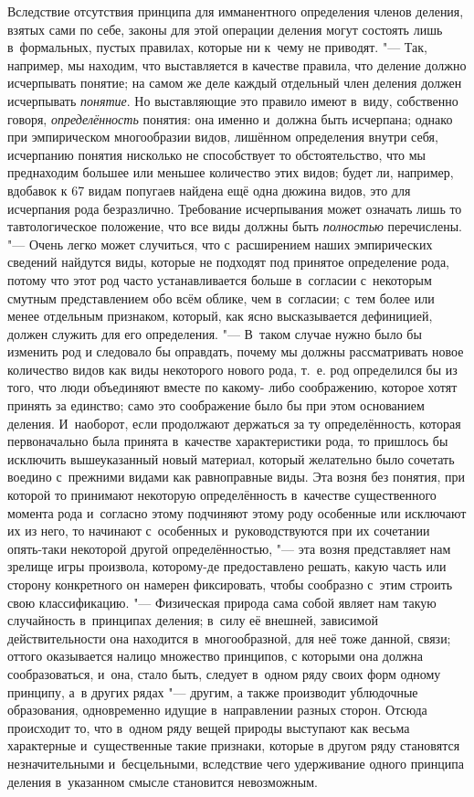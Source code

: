 Вследствие отсутствия принципа для имманентного определения
членов деления, взятых сами по себе, законы для этой операции деления могут
состоять лишь в~формальных, пустых правилах, которые ни к~чему не
приводят. "--- Так, например, мы находим, что выставляется в
качестве правила, что деление должно исчерпывать понятие; на самом же деле
каждый отдельный член деления должен исчерпывать {\em понятие}. Но
выставляющие это правило имеют в~виду, собственно говоря, {\em определённость}
понятия: она именно и~должна быть исчерпана; однако при
эмпирическом многообразии видов, лишённом определения внутри
себя, исчерпанию понятия нисколько не способствует то обстоятельство, что
мы преднаходим большее или меньшее количество этих видов; будет ли,
например, вдобавок к 67 видам попугаев найдена ещё одна дюжина видов, это
для исчерпания рода безразлично. Требование исчерпывания может означать
лишь то тавтологическое положение, что все виды должны быть {\em полностью}
перечислены. "--- Очень легко может случиться,
что с~расширением наших эмпирических сведений найдутся виды, которые не
подходят под принятое определение рода, потому что этот род часто
устанавливается больше в~согласии с~некоторым смутным представлением обо
всём облике, чем в~согласии; с~тем более или менее отдельным признаком,
который, как ясно высказывается дефиницией, должен служить для его
определения. "--- В~таком случае нужно было бы изменить род и
следовало бы оправдать, почему мы должны рассматривать новое количество
видов как виды некоторого нового рода, т.~е. род определился бы из того,
что люди объединяют вместе по какому- либо соображению, которое хотят
принять за единство; само это соображение было бы при этом основанием
деления. И~наоборот, если продолжают держаться за ту определённость,
которая первоначально была принята в~качестве характеристики рода, то
пришлось бы исключить вышеуказанный новый материал, который желательно было
сочетать воедино с~прежними видами как равноправные виды. Эта возня без
понятия, при которой то принимают некоторую определённость в~качестве
существенного момента рода и~согласно этому подчиняют этому роду особенные
или исключают их из него, то начинают с~особенных и~руководствуются при их
сочетании опять-таки некоторой другой определённостью, "--- эта
возня представляет нам зрелище игры произвола, которому-де предоставлено
решать, какую часть или сторону конкретного он намерен фиксировать, чтобы
сообразно с~этим строить свою классификацию. "--- Физическая
природа сама собой являет нам такую случайность в~принципах деления; в~силу
её внешней, зависимой действительности она находится в~многообразной, для
неё тоже данной, связи; оттого оказывается налицо множество принципов, с
которыми она должна сообразоваться, и~она, стало быть, следует в~одном ряду
своих форм одному принципу, а~в других рядах "--- другим, а
также производит ублюдочные образования, одновременно идущие в~направлении
разных сторон. Отсюда происходит то, что в~одном ряду вещей природы
выступают как весьма характерные и~существенные такие признаки, которые в
другом ряду становятся незначительными и~бесцельными, вследствие
чего удерживание одного принципа деления в~указанном смысле
становится невозможным.

